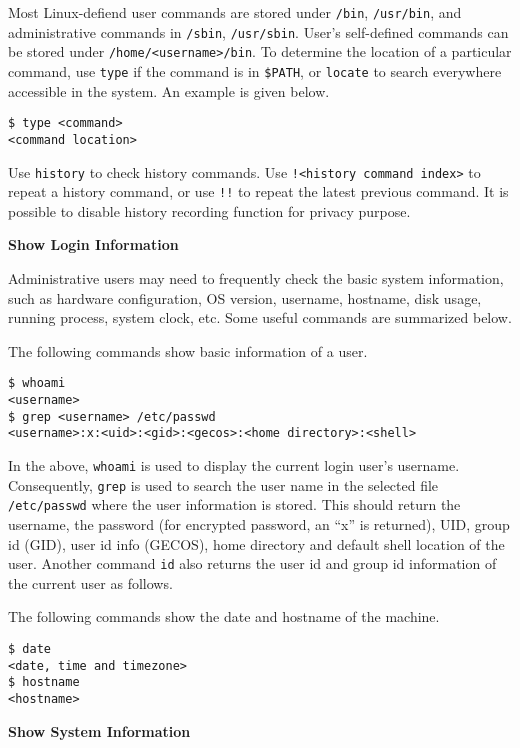 Most Linux-defiend user commands are stored under \verb|/bin|, \verb|/usr/bin|, and administrative commands in \verb|/sbin|, \verb|/usr/sbin|. User's self-defined commands can be stored under \verb|/home/<username>/bin|. To determine the location of a particular command, use \verb|type| if the command is in \verb|$PATH|, or \verb|locate| to search everywhere accessible in the system. An example is given below.
\begin{verbatim}
$ type <command>
<command location>
\end{verbatim}

Use \verb|history| to check history commands. Use \verb|!<history command index>| to repeat a history command, or use \verb|!!| to repeat the latest previous command. It is possible to disable history recording function for privacy purpose.

\vspace{0.1in}
\noindent \textbf{Show Login Information}
\vspace{0.1in}

Administrative users may need to frequently check the basic system information, such as hardware configuration, OS version, username, hostname, disk usage, running process, system clock, etc. Some useful commands are summarized below.

The following commands show basic information of a user.
\begin{verbatim}
$ whoami
<username>
$ grep <username> /etc/passwd
<username>:x:<uid>:<gid>:<gecos>:<home directory>:<shell>
\end{verbatim}
In the above, \verb|whoami| is used to display the current login user's username. Consequently, \verb|grep| is used to search the user name in the selected file \verb|/etc/passwd| where the user information is stored. This should return the username, the password (for encrypted password, an ``x'' is returned), UID, group id (GID), user id info (GECOS), home directory and default shell location of the user.
Another command \verb|id| also returns the user id and group id information of the current user as follows.

The following commands show the date and hostname of the machine.
\begin{verbatim}
$ date
<date, time and timezone>
$ hostname
<hostname>
\end{verbatim}

\vspace{0.1in}
\noindent \textbf{Show System Information}
\vspace{0.1in}

